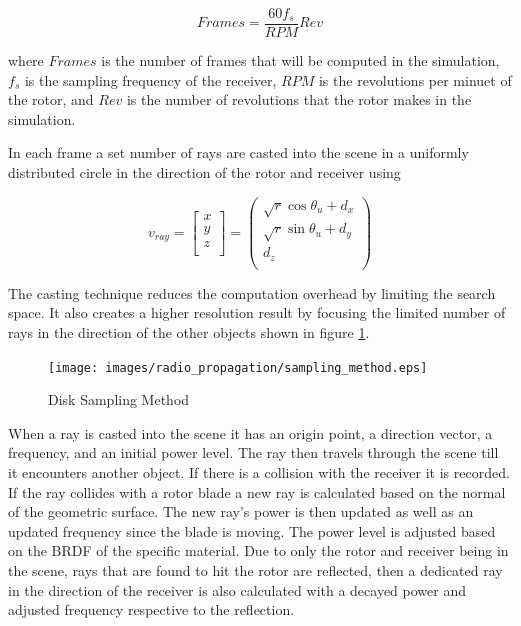 \begin{equation}
	Frames = \frac{60  f_s}{RPM} Rev
	\label{eqn:frames}
\end{equation}

where $Frames$ is the number of frames that will be computed in the simulation, $f_s$ is the sampling frequency of the receiver, $RPM$ is the revolutions per minuet of the rotor, and $Rev$ is the number of revolutions that the rotor makes in the simulation.

In each frame a set number of rays are casted into the scene in a uniformly distributed circle in the direction of the rotor and receiver using

\begin{equation}
	v_{ray} = \begin{bmatrix}
			x \\
			y \\
			z \\
	\end{bmatrix}
	= \begin{pmatrix}
			\sqrt{r} \cos{\theta_u}  + d_x\\
			\sqrt{r} \sin{\theta_u}  + d_y \\
			d_z \\
	\end{pmatrix}
	\label{eqn:disk}
\end{equation}

The casting technique reduces the computation overhead by limiting the search space. It also creates a higher resolution result by focusing the limited number of rays in the direction of the other objects shown in figure \ref{fig:samp_method}.

\begin{figure}
	\begin{center}
		\texttt{[image: images/radio\_propagation/sampling\_method.eps]}
		\caption{Disk Sampling Method}
		\label{fig:samp_method}
	\end{center}
\end{figure}

When a ray is casted into the scene it has an origin point, a direction vector, a frequency, and an initial power level. The ray then travels through the scene till it encounters another object. If there is a collision with the receiver it is recorded. If the ray collides with a rotor blade a new ray is calculated based on the normal of the geometric surface. The new ray's power is then updated as well as an updated frequency since the blade is moving. The power level is adjusted based on the BRDF of the specific material. Due to only the rotor and receiver being in the scene, rays that are found to hit the rotor are reflected, then a dedicated ray in the direction of the receiver is also calculated with a decayed power and adjusted frequency respective to the reflection.

